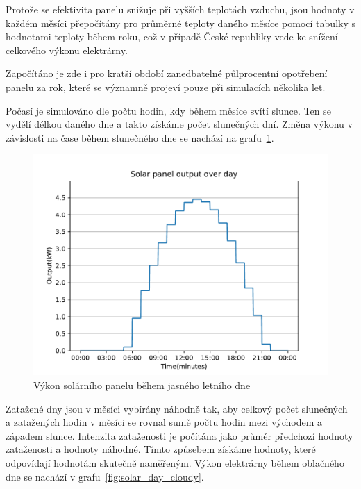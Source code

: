 \documentclass[12pt,a4paper]{article}
\begin{document}
Protože se efektivita panelu snižuje při vyšších teplotách vzduchu, jsou hodnoty v každém měsíci přepočítány pro průměrné teploty daného měsíce pomocí tabulky s hodnotami teploty během roku, což v případě České republiky vede ke snížení celkového výkonu elektrárny. \cite{article}

Započítáno je zde i pro kratší období zanedbatelné půlprocentní opotřebení panelu za rok, které se významně projeví pouze při simulacích několika let.

Počasí je simulováno dle počtu hodin, kdy během měsíce svítí slunce. Ten se vydělí délkou daného dne a takto získáme počet slunečných dní. Změna výkonu  v závislosti na čase během slunečného dne se nachází na grafu~\ref{fig:solar_day_clear}.\cite{9186286}

\begin{figure}
\includegraphics[width=\linewidth]{img/solar_day_clear.pdf}
\caption{Výkon solárního panelu během jasného letního dne}
\label{fig:solar_day_clear}
\end{figure}

Zatažené dny jsou v měsíci vybírány náhodně tak, aby celkový počet slunečných a zatažených hodin v měsíci se rovnal sumě počtu hodin mezi východem a západem slunce. Intenzita zataženosti je počítána jako průměr předchozí hodnoty zataženosti a hodnoty náhodné. Tímto způsebem získáme hodnoty, které odpovídají hodnotám skutečně naměřeným. Výkon elektrárny během oblačného dne se nachází v grafu~\ref{fig:solar_day_cloudy}. \cite{zilvar-2022}
\end{document}
